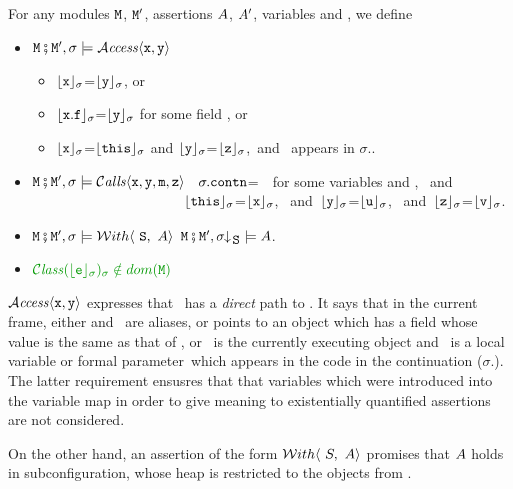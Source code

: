 \begin{definition}  \label{def:valid:assertion:space}
For any modules $\M$, $\M'$, assertions $\A$, $\A'$, variables  and , we define
\begin{itemize}
\item
$\M\mkpair \M', \sigma \models  \CanAccess{\prg{x}}{\prg{y}}$   \IFF  \begin{itemize}
\item
$\interp {\x} {\sigma}$=$\interp {\y} {\sigma}$, or
\item
$\interp {\x.\f} {\sigma}$=$\interp {\y} {\sigma}$  for some field ,  or
\item
$\interp {\x} {\sigma}$=$\interp {\this} {\sigma}$ and
  $\interp {\y} {\sigma}$=$\interp {\z} {\sigma}$,\ 
and \z\ appears in  $\sigma$..
 \end{itemize}
   \item
$\M\mkpair \M', \sigma \models  \Calls{\prg{x},\prg{y},\prg{m},\prg{z}}$ \IFF \
 $\sigma.\prg{contn}$=\ \ for some variables  and ,  \ and \
\\ $\strut ~ \hspace{1.4in} $
$\interp{\prg{this}}{\sigma}$=$\interp{\prg{x}}{\sigma}$, \ and\ $\interp{\prg{y}}{\sigma}$=$\interp{\prg{u}}{\sigma}$,
 \ and\ $\interp{\prg{z}}{\sigma}$=$\interp{\prg{v}}{\sigma}$.
 \item
 $\M\mkpair \M', \sigma \models \Using {\A} {\prg{S}}$
 \IFF
 $\M\mkpair \M', \restrct \sigma {\prg{S}} \models  \A  $.
 \item
  \IFF
$\sd{ {\ClassOf {\interp{\SE}{\sigma}}{\sigma}}\notin dom(\M)}$
\end{itemize}
\end{definition}
 
$\CanAccess{\prg{x}}{\prg{y}}$ expresses that \x\, has a {\em direct} path to \y.
It says that in the current frame,
either \x and \y\, are  aliases, or \x points to an object which has a field
whose value is the same as that of \y, or \x\, is the currently executing object and \y\, is
 a local variable or formal parameter \z\,which appears in the code in the continuation ($\sigma$.).
The latter requirement ensusres that  that variables which were introduced into the variable map  
in order to give meaning to existentially quantified assertions are not considered.

On the other hand, an assertion of the form $\Using{A}{S}$ promises that $\A$ holds in subconfiguration, whose heap is restricted to the objects from .

